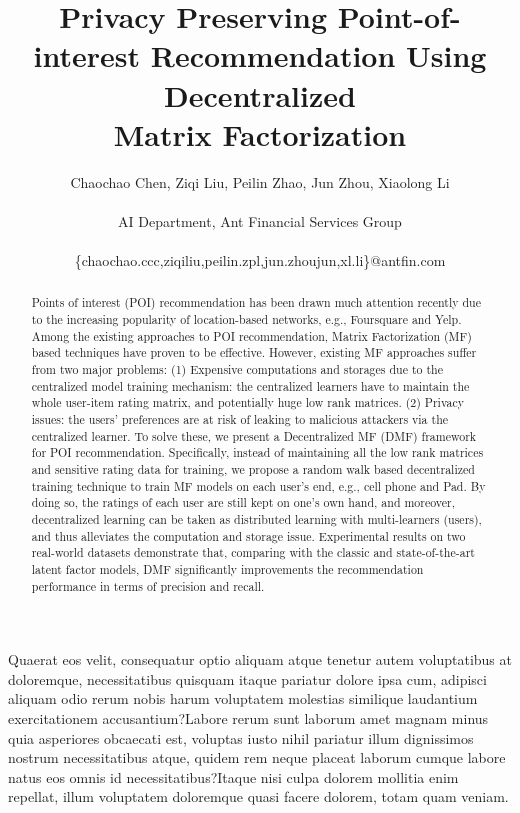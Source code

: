 \documentclass[letterpaper]{article} %
\begin{document}
\title{Privacy Preserving Point-of-interest Recommendation Using Decentralized \\Matrix Factorization}
\author{Chaochao Chen, Ziqi Liu, Peilin Zhao, Jun Zhou, Xiaolong Li\\
~\\AI Department, Ant Financial Services Group\\
~\\\{chaochao.ccc,ziqiliu,peilin.zpl,jun.zhoujun,xl.li\}@antfin.com\\
}
\maketitle
\begin{abstract}
Points of interest (POI) recommendation has been drawn much attention recently due to the increasing popularity
of location-based networks, e.g., Foursquare and Yelp.
Among the existing approaches to POI recommendation, Matrix Factorization (MF) based techniques have proven to be effective.
However, existing MF approaches suffer from two major problems:
(1) Expensive computations and storages due to the centralized model training mechanism: the centralized
learners have to maintain the whole user-item rating matrix, and potentially huge low rank matrices.
(2) Privacy issues: the users' preferences are at risk of leaking to malicious attackers via
the centralized learner.
To solve these, we present a Decentralized MF (DMF) framework for POI recommendation.
Specifically, instead of maintaining all the low rank matrices and sensitive rating data for training, we propose a
random walk based decentralized training technique to train MF models on each user's end, e.g., cell phone and Pad.
By doing so, the ratings of each user are still kept on one's own hand, and moreover, decentralized learning can
be taken as distributed learning with multi-learners (users), and thus alleviates the computation and storage issue.
Experimental results on two real-world datasets demonstrate that, comparing with the classic and state-of-the-art latent factor models, DMF significantly improvements the recommendation performance in terms of precision and recall.
\end{abstract}








Quaerat eos velit, consequatur optio aliquam atque tenetur autem voluptatibus at doloremque, necessitatibus quisquam itaque pariatur dolore ipsa cum, adipisci aliquam odio rerum nobis harum voluptatem molestias similique laudantium exercitationem accusantium?Labore rerum sunt laborum amet magnam minus quia asperiores obcaecati est, voluptas iusto nihil pariatur illum dignissimos nostrum necessitatibus atque, quidem rem neque placeat laborum cumque labore natus eos omnis id necessitatibus?Itaque nisi culpa dolorem mollitia enim repellat, illum voluptatem doloremque quasi facere dolorem, totam quam veniam.\clearpage

\end{document}
